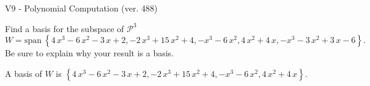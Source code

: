 \begin{exercise}
  \begin{exerciseTitle}V9 - Polynomial Computation (ver. 488)\end{exerciseTitle}
  \begin{exerciseStatement}
    Find a basis for the subspace of \(\mathcal{P}^3\) 
\[W=\mathrm{span}\ \left\{4 \, x^{3} - 6 \, x^{2} - 3 \, x + 2 , -2 \, x^{3} + 15 \, x^{2} + 4 , -x^{3} - 6 \, x^{2} , 4 \, x^{2} + 4 \, x , -x^{3} - 3 \, x^{2} + 3 \, x - 6\right\}.\]
 Be sure to explain why your result is a basis.


  \end{exerciseStatement}
  \begin{exerciseAnswer}
   A basis of \(W\) is  \(\left\{4 \, x^{3} - 6 \, x^{2} - 3 \, x + 2 , -2 \, x^{3} + 15 \, x^{2} + 4 , -x^{3} - 6 \, x^{2} , 4 \, x^{2} + 4 \, x\right\}\).
  


  \end{exerciseAnswer}
\end{exercise}